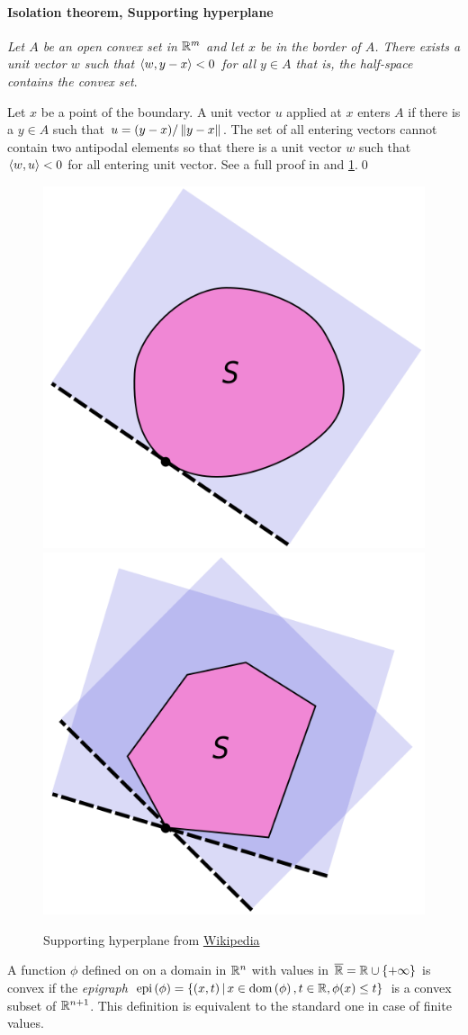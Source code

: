 \documentclass[12pt,a4paper]{amsart}
\theoremstyle{plain}%
\theoremstyle{definition}
\theoremstyle{remark}
\begin{document}
\bigskip
\paragraph{Isolation theorem, Supporting hyperplane} \emph{Let $A$ be an open convex set in $\mathbb{R}^m$ and let $x$ be in the border of $A$. There exists a unit vector $w$ such that  $\left\langle w,y-x\right\rangle < 0$ for all $y \in A$ that is, the half-space contains the convex set}.

Let $x$ be a point of the boundary. A unit vector $u$ applied at $x$
enters $A$ if there is a $y \in A$ such that $u =
(y-x)/\left\Vert y-x\right\Vert$. The set of all entering vectors cannot contain
two antipodal elements so that there is a unit vector $w$ such that
$\left\langle w,u\right\rangle < 0$ for all entering unit vector. See a full proof in \cite[p
45-46]{barvinok:2002} and \cref{fig:hyperplanes}.\qed

\begin{figure}
  \centering
  \includegraphics[width=.40\textwidth]{pictures/Supporting_hyperplane1.png} 
    \includegraphics[width=.40\textwidth]{pictures/Supporting_hyperplane2.png}
  \caption{Supporting hyperplane from \href{https://en.wikipedia.org/wiki/Supporting_hyperplane}{Wikipedia}}
  \label{fig:hyperplanes}
\end{figure}

A function $\phi$ defined on on a domain in $\mathbb{R}^n$ with values in
$\overline{\mathbb{R}} = \mathbb{R} \cup \left\{+\infty\right\}$ is convex if the
\emph{epigraph}
$\operatorname{epi}\left(\phi\right) = \left\{(x,t) \, \middle| \,  x \in \operatorname{dom}\left(\phi\right), t \in \mathbb{R},
  \phi(x) \leq t \right\}$ is a convex subset of $\mathbb{R}^{n+1}$. This
definition is equivalent to the standard one in case of finite values.
\end{document}
